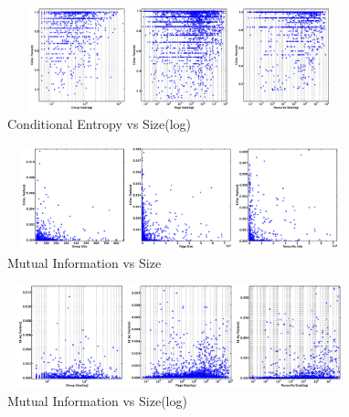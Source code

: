 \begin{figure}
\centering
\includegraphics[width=100mm, height=30mm]{data/CEvsSizeLog.eps}
\caption{Conditional Entropy vs Size(log)}
\label{Fig: Conditional Entropy vs Size(Log)}
\end{figure}

\pagebreak


\begin{figure}
\centering
\includegraphics[width=100mm, height=30mm]{data/MIvsSize.eps}
\caption {Mutual Information vs Size}
\label {Fig: Mutual Information vs Size}
\end{figure}

\begin{figure}
\centering
\includegraphics[width=100mm, height=30mm]{data/MIvsSizelog.eps}
\caption{Mutual Information  vs Size(log)}
\label {Fig: Mutual Information vs Size(log)}
\end{figure}

